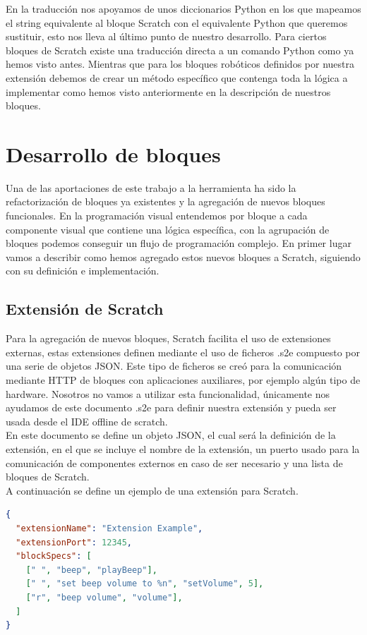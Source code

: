 En la traducción nos apoyamos de unos diccionarios Python en los que mapeamos el string equivalente al bloque Scratch con el equivalente Python que queremos sustituir, esto nos lleva al último punto de nuestro desarrollo. Para ciertos bloques de Scratch existe una traducción directa a un comando Python como ya hemos visto antes. Mientras que para los bloques robóticos definidos por nuestra extensión debemos de crear un método específico que contenga toda la lógica a implementar como hemos visto anteriormente en la descripción de nuestros bloques.\\

\section{Desarrollo de bloques}
\label{sec:desarrollo-de-bloques}

Una de las aportaciones de este trabajo a la herramienta ha sido la refactorización de bloques ya existentes y la agregación de nuevos bloques funcionales. En la programación visual entendemos por bloque a cada componente visual que contiene una lógica específica, con la agrupación de bloques podemos conseguir un flujo de programación complejo. En primer lugar vamos a describir como hemos agregado estos nuevos bloques a Scratch, siguiendo con su definición e implementación.

\subsection{Extensión de Scratch}

Para la agregación de nuevos bloques, Scratch facilita el uso de extensiones externas, estas  extensiones definen mediante el uso de ficheros .s2e compuesto por una serie de objetos JSON. Este tipo de ficheros se creó para la comunicación mediante HTTP de bloques con aplicaciones auxiliares, por ejemplo algún tipo de hardware. Nosotros no vamos a utilizar esta funcionalidad, únicamente nos ayudamos de este documento .s2e para definir nuestra extensión y pueda ser usada desde el IDE offline de scratch.\\

En este documento se define un objeto JSON, el cual será la definición de la extensión, en el que se incluye el nombre de la extensión, un puerto usado para la comunicación de componentes externos en caso de ser necesario y una lista de bloques de Scratch. \\

A continuación se define un ejemplo de una extensión para Scratch. 
\begin{lstlisting}[language=json,firstnumber=1]
{ 
  "extensionName": "Extension Example",
  "extensionPort": 12345,
  "blockSpecs": [
    [" ", "beep", "playBeep"],
	[" ", "set beep volume to %n", "setVolume", 5],
	["r", "beep volume", "volume"],
  ]
}
\end{lstlisting}

